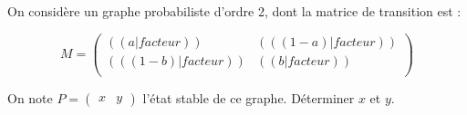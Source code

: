 \exercice
On considère un graphe probabiliste d'ordre 2, dont la matrice de transition est :

\[
M=\begin{pmatrix}
  (( a|facteur )) & (( (1-a)|facteur )) \\
  (( (1-b)|facteur )) & (( b|facteur )) \\
\end{pmatrix}
\]

On note $P=\begin{pmatrix}x&y\end{pmatrix}$ l'état stable de ce graphe. Déterminer $x$ et $y$.
